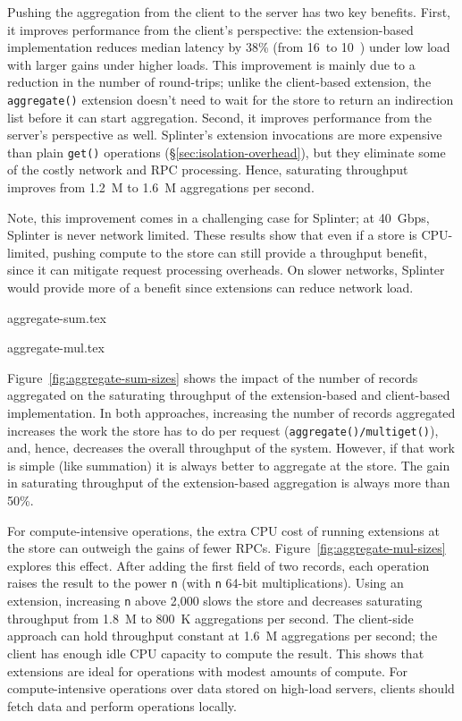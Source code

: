 Pushing the aggregation from the client to the server has two key benefits.
First, it improves performance from the client's perspective: the
  extension-based implementation reduces median latency by 38\% (from
  16~\us to 10~\us) under low load with larger gains under higher loads.
This improvement is mainly due to a reduction in the number of round-trips;
unlike the client-based extension, the \texttt{aggregate()} extension doesn't
  need to wait for the store to return an indirection list before it can start
  aggregation.
Second, it improves performance from the server's perspective as well.
Splinter's extension invocations are more expensive than plain \texttt{get()}
  operations (\S\ref{sec:isolation-overhead}), but they eliminate
  some of the costly network and RPC processing.
Hence, saturating throughput improves from 1.2~M to 1.6~M aggregations
  per second.

Note, this improvement comes in a challenging case for Splinter; at 40~Gbps,
  Splinter is never network limited.
These results show that even if a store is CPU-limited, pushing compute to the
  store can still provide a throughput benefit, since it can mitigate
  request processing overheads.
On slower networks, Splinter would provide more of a benefit since extensions
  can reduce network load.

 {aggregate-sum.tex}

 {aggregate-mul.tex}

Figure~\ref{fig:aggregate-sum-sizes} shows the impact of the number of
  records aggregated on the saturating throughput of the extension-based
  and client-based implementation.
In both approaches, increasing the number of records aggregated
  increases the work the store has to do per request
  (\texttt{aggregate()/multiget()}), and, hence, decreases the overall
  throughput of the system. 
However, if that work is simple (like summation) it is always better to
  aggregate at the store.
The gain in saturating throughput of the extension-based aggregation is
  always more than 50\%.

For compute-intensive operations, the extra CPU cost of
running extensions at the store can outweigh the gains of fewer RPCs.
Figure~\ref{fig:aggregate-mul-sizes} explores this effect.
After adding the first field of two records, each operation raises the
  result to the power \texttt{n} (with \texttt{n} 64-bit
  multiplications).
Using an extension, increasing \texttt{n} above 2,000
  slows the store and decreases
  saturating throughput from 1.8~M to 800~K aggregations per second.
The client-side approach can hold throughput constant
  at 1.6~M aggregations per second;
the client has enough idle CPU capacity to compute the result.
This shows that extensions are ideal for operations with
  modest amounts of compute.
For compute-intensive operations over data stored on high-load servers,
  clients should fetch data and perform operations locally.

